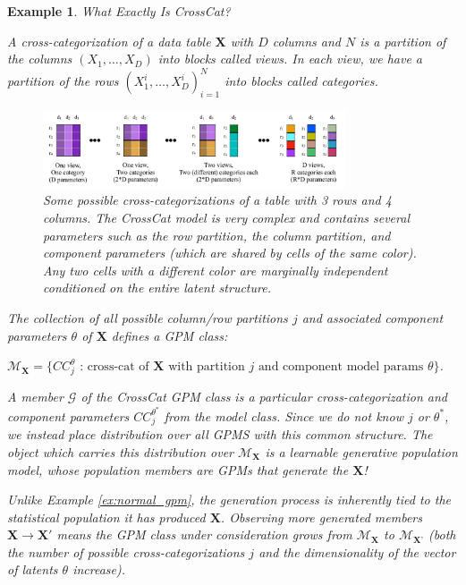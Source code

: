 \documentclass[10pt,letterpaper]{article}
\newtheorem{example}{Example}[section]
\newcommand{\set}[1]{\{#1\}}
\begin{document}
\begin{example} \label{ex:crosscat} What Exactly Is CrossCat?

A cross-categorization of a data table $\mathbf{X}$ with $D$ columns and $N$ is
a partition of the columns $(X_1,\dots,X_D)$ into blocks called \textit{views}.
In each view, we have a partition of the rows $(X_1^{i},\dots,X_D^{i})_{i=1}^N$
into blocks called \textit{categories}.

\begin{figure}[ht]
    \centering
\includegraphics[width=0.8\textwidth]{cc.jpeg}
\caption{Some possible cross-categorizations of a table with 3 rows and 4
columns. The CrossCat model is very complex and contains several parameters such
as the row partition, the column partition, and component parameters (which are
shared by cells of the same color). Any two cells with a different color are
marginally independent conditioned on the entire latent structure.}
\label{fig:cc}
\end{figure}
The collection of all possible column/row partitions $j$ and associated
component parameters $\theta$ of $\mathbf{X}$ defines a GPM class:

$\mathcal{M}_\textbf{X} = \set{CC_j^{\theta} \text{ : cross-cat of } \mathbf{X}
\text{ with partition } j \text{ and component model params } \theta}$.

A member $\mathcal{G}$ of the CrossCat GPM class is a particular cross-categorization and component parameters $CC_j^{\theta^*}$ from
the model class. Since we do not know $j$ or $\theta^*$, we instead place
distribution over all GPMS with this common structure. The object which carries this distribution over $\mathcal{M}_\textbf{X}$ is a learnable generative population model, whose population members are GPMs that generate the $\mathbf{X}$!

Unlike Example \ref{ex:normal_gpm}, the generation process is
inherently tied to the statistical population it has produced $\mathbf{X}$.
Observing more generated members $\mathbf{X} \to
\mathbf{X}'$ means the GPM class under consideration grows from
$\mathcal{M}_\textbf{X}$ to $\mathcal{M}_\textbf{X'}$ (both the number of
possible cross-categorizations $j$ and the dimensionality of the vector of
latents $\theta$ increase).

\end{example}
\end{document}

